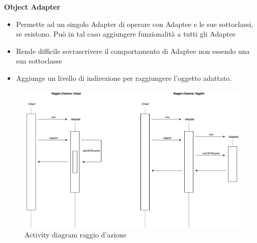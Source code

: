 \textbf{Object Adapter}
\begin{itemize}
    \item Permette ad un singolo Adapter di operare con Adaptee e le sue sottoclassi, se esistono. Può in tal caso aggiungere funzionalità a tutti gli Adaptee
    \item Rende difficile sovrascrivere il comportamento di Adaptee non essendo una sua sottoclasse
    \item Aggiunge un livello di indirezione per raggiungere l'oggetto adattato.
\end{itemize}

\begin{figure}[H]
    \centering
    \includegraphics[width=1\linewidth]{assets/pattern/adapter/adapter-activity.drawio.png}
    \caption{Activity diagram raggio d'azione}
\end{figure}

\newpage